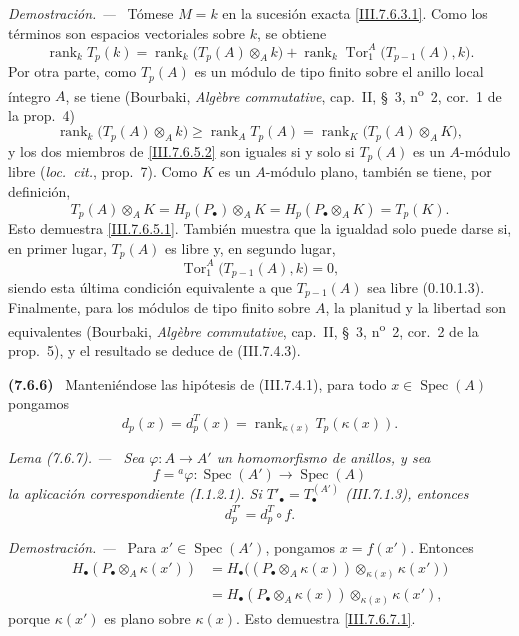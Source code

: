 \documentclass[10pt,oneside]{book}
\newcommand{\kres}{\kappa}
\newcommand{\Spec}{\operatorname{Spec}}
\newcommand{\Tor}{\operatorname{Tor}}
\newcommand{\sref}[2][]{\textup{(#2)}}
\newcommand{\oldpage}[2][]{\setcounter{footnote}{0}\marginpar{\scriptsize\textbf{#1}~|~#2}\ignorespaces}
\newenvironment{env}[1][]{\par\medskip\noindent\textbf{(#1)}\ }{\par}
\newenvironment{lemma}[1][]{\par\medskip\noindent\itshape Lema (#1). ---\ }{\par}
\newenvironment{proof}{\par\medskip\noindent\textit{Demostración. ---\ }}{\par}
\begin{document}
\begin{proof}
Tómese $M=k$ en la sucesión exacta \eqref{III.7.6.3.1}. Como los
términos son espacios vectoriales sobre $k$, se obtiene
\[
  \operatorname{rank}_k T_p(k)
  =
  \operatorname{rank}_k\bigl(T_p(A)\otimes_A k\bigr)
  +
  \operatorname{rank}_k
  \Tor_1^A\bigl(T_{p-1}(A),k\bigr).
\]
Por otra parte, como $T_p(A)$ es un módulo de tipo finito sobre el
anillo local íntegro $A$, se tiene (Bourbaki,
\emph{Alg\`ebre commutative}, cap.~II, \S~3,
n\textsuperscript{o}~2, cor.~1 de la prop.~4)
\[
  \operatorname{rank}_k\bigl(T_p(A)\otimes_A k\bigr)
  \geq
  \operatorname{rank}_A T_p(A)
  =
  \operatorname{rank}_K\bigl(T_p(A)\otimes_A K\bigr),
  \tag{7.6.5.2}\label{III.7.6.5.2}
\]
y los dos miembros de \eqref{III.7.6.5.2} son iguales si y solo si
$T_p(A)$ es un $A$-módulo libre (\emph{loc.\ cit.}, prop.~7). Como
$K$ es un $A$-módulo plano, también se tiene, por definición,
\[
  T_p(A)\otimes_A K
  =
  H_p(P_\bullet)\otimes_A K
  =
  H_p(P_\bullet\otimes_A K)
  =
  T_p(K).
\]
Esto demuestra \eqref{III.7.6.5.1}. También muestra que la igualdad
solo puede darse si, en primer lugar, $T_p(A)$ es libre y, en segundo
lugar,
\[
  \Tor_1^A\bigl(T_{p-1}(A),k\bigr)=0,
\]
siendo esta última condición equivalente a que $T_{p-1}(A)$ sea
libre \sref[0]{0.10.1.3}. Finalmente, para los módulos de tipo finito
sobre $A$, la planitud y la libertad son equivalentes (Bourbaki,
\emph{Alg\`ebre commutative}, cap.~II, \S~3,
n\textsuperscript{o}~2, cor.~2 de la prop.~5), y el resultado se
deduce de \sref{III.7.4.3}.
\end{proof}

\begin{env}[7.6.6]
\label{III.7.6.6}
Manteniéndose las hipótesis de \sref{III.7.4.1}, para todo
$x\in\Spec(A)$ pongamos
\[
  d_p(x)=d_p^T(x)
  =
  \operatorname{rank}_{\kres(x)}T_p(\kres(x)).
  \tag{7.6.6.1}\label{III.7.6.6.1}
\]
\end{env}

\begin{lemma}[7.6.7]
\label{III.7.6.7}
Sea $\varphi:A\to A'$ un homomorfismo de anillos, y sea
\[
  f={}^a\!\varphi:\Spec(A')\longrightarrow\Spec(A)
\]
la aplicación correspondiente \textup{\sref[I]{I.1.2.1}}. Si
$T'_\bullet=T_\bullet^{(A')}$ \textup{\sref{III.7.1.3}}, entonces
\[
  d_p^{T'}=d_p^T\circ f.
  \tag{7.6.7.1}\label{III.7.6.7.1}
\]
\end{lemma}

\oldpage[III]{195}
\begin{proof}
Para $x'\in\Spec(A')$, pongamos $x=f(x')$. Entonces
\begin{align*}
  H_\bullet(P_\bullet\otimes_A\kres(x'))
  &=
  H_\bullet\bigl(
    (P_\bullet\otimes_A\kres(x))
    \otimes_{\kres(x)}\kres(x')
  \bigr)\\
  &=
  H_\bullet(P_\bullet\otimes_A\kres(x))
  \otimes_{\kres(x)}\kres(x'),
\end{align*}
porque $\kres(x')$ es plano sobre $\kres(x)$. Esto demuestra
\eqref{III.7.6.7.1}.
\end{proof}
\end{document}
